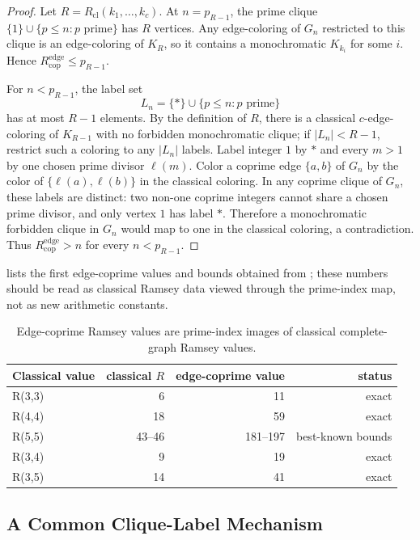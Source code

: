 \documentclass[11pt]{article}
\theoremstyle{plain}
\theoremstyle{definition}
\theoremstyle{remark}
\newcommand{\Redge}{R_{\mathrm{cop}}^{\mathrm{edge}}}
\newcommand{\Rcl}{R_{\mathrm{cl}}}
\begin{document}
\begin{proof}
Let $R=\Rcl(k_1,\ldots,k_c)$.  At $n=p_{R-1}$, the prime clique
$\{1\}\cup\{p\le n:p\text{ prime}\}$ has $R$ vertices.  Any edge-coloring of
$G_n$ restricted to this clique is an edge-coloring of $K_R$, so it contains
a monochromatic $K_{k_i}$ for some $i$.  Hence $\Redge\le p_{R-1}$.

For $n<p_{R-1}$, the label set
\[
  L_n=\{*\}\cup\{p\le n:p\text{ prime}\}
\]
has at most $R-1$ elements.  By the definition of $R$, there is a classical
$c$-edge-coloring of $K_{R-1}$ with no forbidden monochromatic clique; if
$|L_n|<R-1$, restrict such a coloring to any $|L_n|$ labels.  Label integer
$1$ by $*$ and every $m>1$ by one chosen prime divisor $\ell(m)$.
Color a coprime edge $\{a,b\}$ of $G_n$ by the color of
$\{\ell(a),\ell(b)\}$ in the classical coloring.  In any coprime clique of
$G_n$, these labels are distinct: two non-one coprime integers cannot share a
chosen prime divisor, and only vertex $1$ has label $*$.  Therefore a
monochromatic forbidden clique in $G_n$ would map to one in the classical
coloring, a contradiction.  Thus $\Redge>n$ for every $n<p_{R-1}$.
\end{proof}

 lists the first edge-coprime values and bounds
obtained from ; these numbers should be read as
classical Ramsey data viewed through the prime-index map, not as new
arithmetic constants.

\begin{table}[htbp]
\centering
\caption{Edge-coprime Ramsey values are prime-index images of classical
complete-graph Ramsey values.}
\label{tab:edge-coprime}
\small
\begin{tabular}{@{}lrrr@{}}
\toprule
Classical value & classical $R$ & edge-coprime value & status \\
\midrule
R(3,3) & 6 & 11 & exact \\
R(4,4) & 18 & 59 & exact \\
R(5,5) & 43--46 & 181--197 & best-known bounds \\
R(3,4) & 9 & 19 & exact \\
R(3,5) & 14 & 41 & exact \\
\bottomrule
\end{tabular}

\end{table}

\subsection{A Common Clique-Label Mechanism}
\label{subsec:clique-label}
\end{document}
